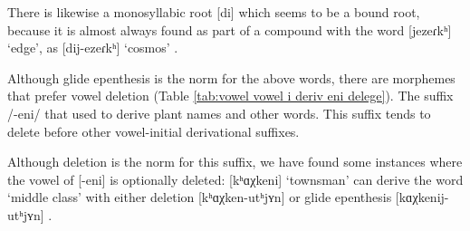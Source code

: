 {	There is likewise a monosyllabic root [di]  which seems to be a bound root, because it is almost always found as part of a compound with the word [jezeɾkʰ] `edge', as [dij-ezeɾkʰ] `cosmos' . 
	
	Although glide epenthesis is the norm for the above words, there are morphemes that prefer vowel deletion (Table \ref{tab:vowel vowel i deriv eni delege}). The suffix /-eni/ that   used to derive plant names and other words. This suffix tends to delete before other vowel-initial derivational suffixes. 
	
	
	
	
	
	\begin{table}[H]
		\centering
		\caption{Vowel deletion in  derivation for stems with suffix [-eni] }
		\label{tab:vowel vowel i deriv eni delege}
		\end{table}
	
	Although deletion is the norm for this suffix, we have found some instances where the vowel of  [-eni] is optionally deleted: [kʰɑχkeni] `townsman'  can derive the word `middle class' with either deletion [kʰɑχken-utʰjʏn]  or glide epenthesis [kɑχkenij-utʰjʏn] . 
	
}
